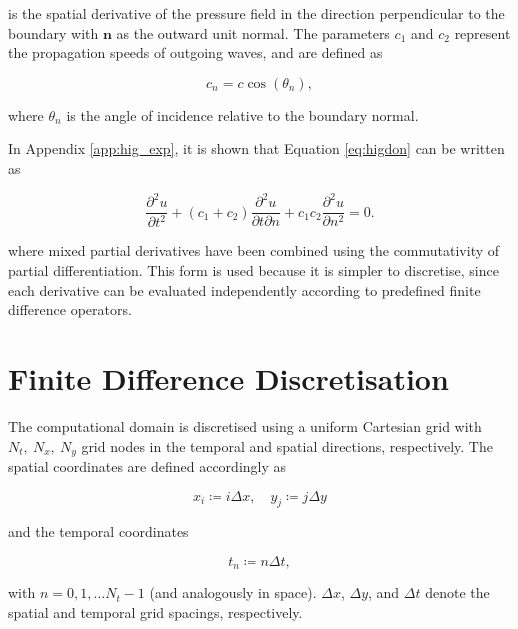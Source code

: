 \documentclass[final-report]{report-template}
\begin{document}
is the spatial derivative of the pressure field in the direction perpendicular to the boundary with $\mathbf n$ as the outward unit normal. The parameters $c_1$ and $c_2$ represent the propagation speeds of outgoing waves, and are defined as

\begin{equation}
    c_n = c \cos(\theta_n),
    \label{eq:phasevel}
\end{equation}

where $\theta_n$ is the angle of incidence relative to the boundary normal. 

In Appendix \ref{app:hig_exp}, it is shown that Equation \eqref{eq:higdon} can be written as

\begin{equation}
    \frac{\partial^2 u}{\partial t^2} + 
    (c_1 + c_2) \frac{\partial^2 u}{\partial t \partial n } + 
    c_1 c_2 \frac{\partial^2 u}{\partial n^2} = 0.
    \label{eq:higdon_expanded}
\end{equation}

where mixed partial derivatives have been combined using the commutativity of partial differentiation. This form is used because it is simpler to discretise, since each derivative can be evaluated independently according to predefined finite difference operators.

\section{Finite Difference Discretisation}
\label{subsect:discretisation}

The computational domain is discretised using a uniform Cartesian grid with $N_t,\ N_x,\ N_y$ grid nodes in the temporal and spatial directions, respectively. The spatial coordinates are defined accordingly as

\begin{equation}
    x_i \coloneqq i\Delta x, \quad y_j \coloneqq j\Delta y
    \label{eq:spatdisc}
\end{equation}

and the temporal coordinates

\begin{equation}
    t_n \coloneqq n\Delta t,
    \label{eq:tempdisc}
\end{equation}

with $n = 0, 1, \dots N_t - 1$ (and analogously in space). $\Delta x$, $\Delta y$, and $\Delta t$ denote the spatial and temporal grid spacings, respectively.
\end{document}
